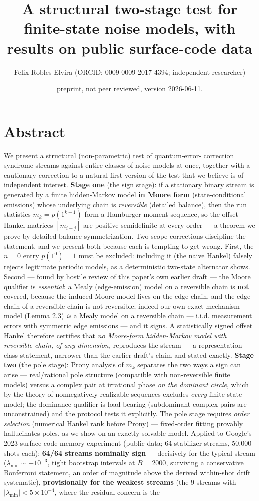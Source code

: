 \documentclass[11pt]{article}
\title{A structural two-stage test for finite-state noise models, with results on public surface-code data}
\author{Felix Robles Elvira (ORCID: 0009-0009-2017-4394; independent researcher)}
\date{\small preprint, not peer reviewed, version 2026-06-11.}
\begin{document}
\maketitle

\section*{Abstract}
We present a structural (non-parametric) test of quantum-error- correction syndrome streams against entire classes of noise models at once, together with a cautionary correction to a natural first version of the test that we believe is of independent interest. \textbf{Stage one} (the sign stage): if a stationary binary stream is generated by a finite hidden-Markov model \textbf{in Moore form} (state-conditional emissions) whose underlying chain is \emph{reversible} (detailed balance), then the run statistics $m_k = p(1^{k+1})$ form a Hamburger moment sequence, so the offset Hankel matrices $[m_{i+j}]$ are positive semidefinite at every order — a theorem we prove by detailed-balance symmetrization.  Two scope corrections discipline the statement, and we present both because each is tempting to get wrong.  First, the $n = 0$ entry $p(1^0) = 1$ must be excluded: including it (the naive Hankel) falsely rejects legitimate periodic models, as a deterministic two-state alternator shows.  Second — found by hostile review of this paper's own earlier draft — the Moore qualifier is \emph{essential}: a Mealy (edge-emission) model on a reversible chain is \textbf{not} covered, because the induced Moore model lives on the edge chain, and the edge chain of a reversible chain is not reversible; indeed our own exact mechanism model (Lemma 2.3) \emph{is} a Mealy model on a reversible chain — i.i.d. measurement errors with symmetric edge emissions — and it signs. A statistically signed offset Hankel therefore certifies that \emph{no Moore-form hidden-Markov model with reversible chain, of any dimension,} reproduces the stream — a representation-class statement, narrower than the earlier draft's claim and stated exactly.  \textbf{Stage two} (the pole stage): Prony analysis of $m_k$ separates the two ways a sign can arise — real/rational pole structure (compatible with non-reversible finite models) versus a complex pair at irrational phase \emph{on the dominant circle}, which by the theory of nonnegatively realizable sequences excludes \emph{every} finite-state model; the dominance qualifier is load-bearing (subdominant complex pairs are unconstrained) and the protocol tests it explicitly.  The pole stage requires \emph{order selection} (numerical Hankel rank before Prony) — fixed-order fitting provably hallucinates poles, as we show on an exactly solvable model.  Applied to Google's 2023 surface-code memory experiment (public data; 64 stabilizer streams, 50{,}000 shots each): \textbf{64/64 streams nominally sign} — decisively for the typical stream ($\lambda_{\min} \sim -10^{-3}$, tight bootstrap intervals at $B = 2000$, surviving a conservative Bonferroni statement, an order of magnitude above the derived within-shot drift systematic), \textbf{provisionally for the weakest streams} (the 9 streams with $|\lambda_{\min}| < 5\times 10^{-4}$, where the residual concern is the 
\end{document}
